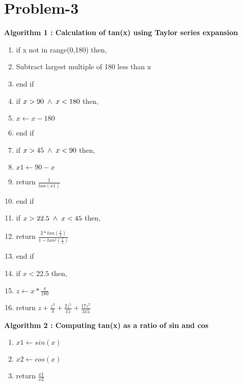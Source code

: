 \documentclass[12pt]{article}
\begin{document}
\section{Problem-3}
\textbf{Algorithm 1 : Calculation of tan(x) using Taylor series expansion}
\begin{enumerate}
    \item if x not in range(0,180) then,
    \item \hspace*{10mm} Subtract largest multiple of 180 less than x 
    \item end if
    \item if $ x > 90 \hspace{1mm} \wedge \hspace{1mm} x < 180 $ then,
    \item \hspace*{10mm} $ x  \leftarrow x - 180 $
    \item end if
    \item if $ x > 45 \hspace{1mm} \wedge \hspace{1mm} x < 90 $ then,
    \item \hspace*{10mm} $x1 \leftarrow 90 - x $
    \item \hspace*{10mm} return $ \frac{1}{ tan(x1) }  $
    \item end if
    \item if $ x > 22.5 \hspace{1mm} \wedge \hspace{1mm} x < 45 $ then,
    \item \hspace{10mm} return $ \frac{ 2*tan(\frac{x}{2})}{1 - tan^2(\frac{x}{2})}$
    \item end if 
    \item if $ x < 22.5 $ then,
    \item \hspace{10mm} $ z \leftarrow x * \frac{\pi}{180} $
    \item \hspace{10mm} return $ z + \frac{z^3}{3} + \frac{2z^5}{15} + \frac{17z^7}{315} $
\end{enumerate}
\newpage
\textbf{Algorithm 2 : Computing tan(x) as a ratio of sin and cos}
\begin{enumerate}
    \item $x1 \leftarrow sin(x)$
    \item $x2 \leftarrow cos(x)$
    \item return $ \frac{x1}{x2}$
\end{enumerate}
\end{document}
